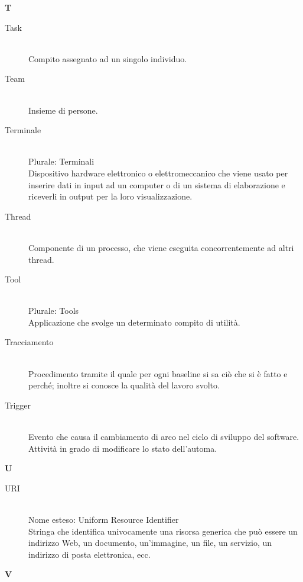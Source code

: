 \newpage 
\begin{center}\textbf{\Huge{T}}\end{center}
\begin{description}\item[Task] \hfill \\
Compito assegnato ad un singolo individuo.
 \item[Team] \hfill \\
Insieme di persone.
 \item[Terminale] \hfill \\
Plurale: Terminali\\ 
Dispositivo hardware elettronico o elettromeccanico che viene usato per inserire dati in input ad un computer o di un sistema di elaborazione e riceverli in output per la loro visualizzazione.
 \item[Thread] \hfill \\
Componente di un processo, che viene eseguita concorrentemente ad altri thread.
 \item[Tool] \hfill \\
Plurale: Tools\\ 
Applicazione che svolge un determinato compito di utilità.
 \item[Tracciamento] \hfill \\
Procedimento tramite il quale per ogni baseline si sa ciò che si è fatto e perché; inoltre  si conosce la qualità del lavoro svolto.
 \item[Trigger] \hfill \\
Evento che causa il cambiamento di arco nel ciclo di
		sviluppo del software. Attività in grado di modificare lo stato
		dell'automa.
 \end{description}
\newpage 
\begin{center}\textbf{\Huge{U}}\end{center}
\begin{description}\item[URI] \hfill \\
Nome esteso: Uniform Resource Identifier\\ 
Stringa che identifica univocamente una risorsa generica che può essere un indirizzo Web, un documento, un'immagine, un file, un servizio, un indirizzo di posta elettronica, ecc.
 \end{description}
\newpage 
\begin{center}\textbf{\Huge{V}}\end{center}
